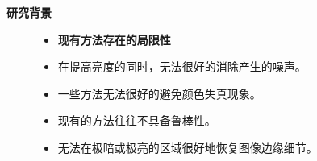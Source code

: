 \documentclass[CJK,aspectratio=169]{beamer}  %
\begin{document}
	\begin{frame}
		{ \yahei \textbf{研究背景}}
		
		\begin{figure}
		\begin{minipage}{.4\columnwidth}
			\begin{itemize}
				\item {} \yahei \textbf{现有方法存在的局限性}
				
				\item[\XSolidBrush]
				 \yahei 在提高亮度的同时，无法很好的消除产生的噪声。
				
				\item[\XSolidBrush]
				 \yahei 一些方法无法很好的避免颜色失真现象。
				
				\item[\XSolidBrush]
				 \yahei 现有的方法往往不具备鲁棒性。
				\item[\XSolidBrush]
				 \yahei 无法在极暗或极亮的区域很好地恢复图像边缘细节\textcolor{blue}{\citep{xu2023low}}。
				
				\vspace{0.2cm}
				

\end{itemize}
\end{minipage}
\end{figure}
\end{frame}
\end{document}
